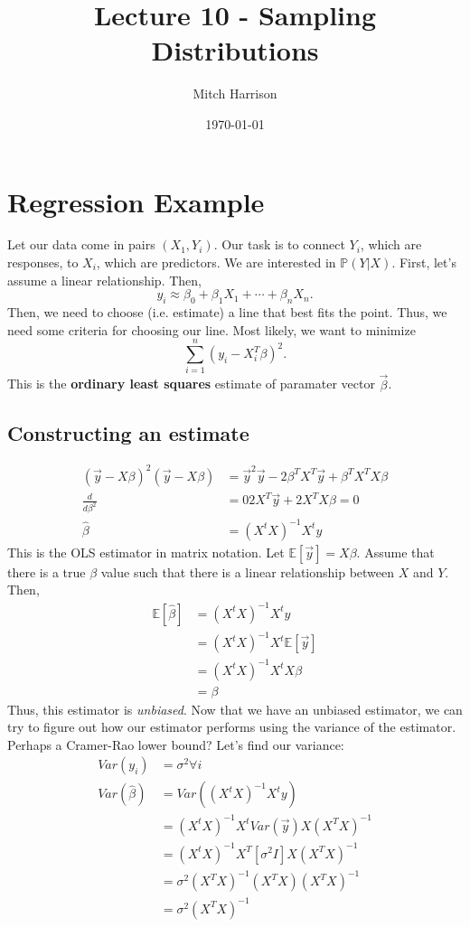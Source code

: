 \documentclass[titlepage, 12pt, leqno]{article}
\title{\Huge{Lecture 10 - Sampling Distributions}}
\author{\large{Mitch Harrison}}
\date{\today}
\begin{document}
\setlength{\parskip}{1\baselineskip}
\setlength{\parindent}{15pt}
\maketitle
\tableofcontents
\newpage


\section{Regression Example}

Let our data come in pairs $(X_{1}, Y_{i})$. Our task is to connect $Y_{i}$, 
which are responses, to $X_{i}$, which are predictors. We are interested in
$\mathbb{P}(Y|X)$. First, let's assume a linear relationship. Then,
\[
    y_{i} \approx \beta_{0} + \beta_{1}X_{1} + \cdots + \beta_{n}X_{n}.
\]
Then, we need to choose (i.e. estimate) a line that best fits the point. Thus,
we need some criteria for choosing our line. Most likely, we want to minimize
\[
    \sum_{i=1}^{n}(y_{i}-X_{i}^{T}\beta)^{2}.
\]
This is the \textbf{ordinary least squares} estimate of paramater vector
$\vec \beta$.

\subsection{Constructing an estimate}
\begin{align*}
    (\vec y-X\beta)^{2}(\vec y-X\beta)
    &= \vec y^{2}\vec y - 2\beta^{T}X^{T}\vec y + \beta^{T}X^{T}X\beta \\
    \frac{d}{d\beta^{2}} &= 02X^{T}\vec y + 2X^{T}X\beta = 0 \\
    \hat \beta &= (X^{t}X)^{-1}X^{t}y
\end{align*}
This is the OLS estimator in matrix notation. Let $\mathbb{E}[\vec y] = X\beta$.
Assume that there is a true $\beta$ value such that there is a linear 
relationship between $X$ and $Y$. Then,
\begin{align*}
    \mathbb{E}[\hat \beta]
    &= (X^{t}X)^{-1}X^{t}y \\
    &= (X^{t}X)^{-1}X^{t}\mathbb{E}[\vec y] \\
    &= (X^{t}X)^{-1}X^{t}X\beta \\
    &= \beta
\end{align*}
Thus, this estimator is \textit{unbiased}. Now that we have an unbiased
estimator, we can try to figure out how our estimator performs using the
variance of the estimator. Perhaps a Cramer-Rao lower bound? Let's find our
variance:
\begin{align*}
    Var(y_{i}) &= \sigma^{2} \forall i \\
    Var(\hat \beta) 
    &= Var((X^{t}X)^{-1}X^{t}y) \\
    &= (X^{t}X)^{-1}X^{t} Var(\vec y)X(X^{T}X)^{-1} \\
    &= (X^{t}X)^{-1}X^{T} [\sigma^{2} I] X(X^{T}X)^{-1} \\
    &= \sigma^{2} (X^{T}X)^{-1}(X^{T}X)(X^{T}X)^{-1} \\
    &= \sigma^{2}(X^{T}X)^{-1}
\end{align*}
\end{document}
